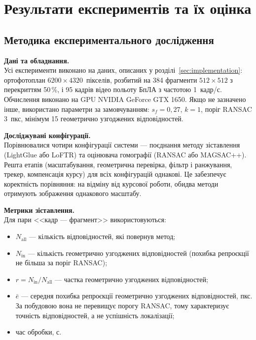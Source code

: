 \providecommand{\px}{пкс}
\providecommand{\code}[1]{\texttt{#1}}

\newpage
\section{Результати експериментів та їх оцінка}
\label{sec:experiments}

\subsection{Методика експериментального дослідження}

\textbf{Дані та обладнання.}\\
Усі експерименти виконано на даних, описаних у розділі~\ref{sec:implementation}: ортофотоплан $6200 \times 4320$~пікселів, розбитий на 384 фрагменти $512 \times 512$ з перекриттям 50\,\%, і 95 кадрів відео польоту БпЛА з частотою 1~кадр/с. Обчислення виконано на GPU NVIDIA GeForce GTX 1650. Якщо не зазначено інше, використано параметри за замовчуванням: $s_f = 0{,}27$, $k = 1$, поріг RANSAC 3~\px{}, мінімум 15 геометрично узгоджених відповідностей.

\textbf{Досліджувані конфігурації.}\\
Порівнювалися чотири конфігурації системи --- поєднання методу зіставлення (LightGlue або LoFTR) та оцінювача гомографії (RANSAC або MAGSAC++). Решта етапів (масштабування, геометрична перевірка, фільтр і ранжування, трекер, компенсація курсу) для всіх конфігурацій однакові. Це забезпечує коректність порівняння: на відміну від курсової роботи, обидва методи отримують зображення однакового масштабу.

\textbf{Метрики зіставлення.}\\
Для пари <<кадр --- фрагмент>> використовуються:
\begin{itemize}
    \item $N_{\text{all}}$ --- кількість відповідностей, які повернув метод;
    \item $N_{\text{in}}$ --- кількість геометрично узгоджених відповідностей (похибка репроєкції не більша за поріг RANSAC);
    \item $r = N_{\text{in}} / N_{\text{all}}$ --- частка геометрично узгоджених відповідностей;
    \item $\bar{e}$ --- середня похибка репроєкції геометрично узгоджених відповідностей, \px{}. За побудовою вона не перевищує порогу RANSAC, тому характеризує точність відповідностей, а не успішність локалізації;
    \item час обробки, с.
\end{itemize}


